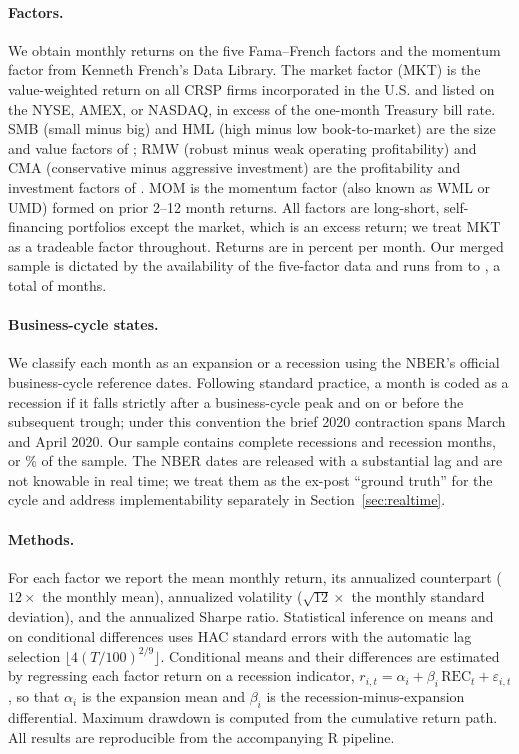 \documentclass[12pt]{article}
\begin{document}
\paragraph{Factors.} We obtain monthly returns on the five Fama--French
factors and the momentum factor from Kenneth French's Data Library. The market
factor (MKT) is the value-weighted return on all CRSP firms incorporated in the
U.S. and listed on the NYSE, AMEX, or NASDAQ, in excess of the one-month
Treasury bill rate. SMB (small minus big) and HML (high minus low book-to-market)
are the size and value factors of \citet{fama1993common}; RMW (robust minus weak
operating profitability) and CMA (conservative minus aggressive investment) are
the profitability and investment factors of \citet{fama2015five}. MOM is the
momentum factor (also known as WML or UMD) formed on prior 2--12 month returns.
All factors are long-short, self-financing portfolios except the market, which
is an excess return; we treat MKT as a tradeable factor throughout. Returns are
in percent per month. Our merged sample is dictated by the availability of the
five-factor data and runs from \sampStart{} to \sampEnd, a total of \nMonths{}
months.

\paragraph{Business-cycle states.} We classify each month as an expansion or a
recession using the NBER's official business-cycle reference dates. Following
standard practice, a month is coded as a recession if it falls strictly after a
business-cycle peak and on or before the subsequent trough; under this
convention the brief 2020 contraction spans March and April 2020. Our sample
contains \nRecessions{} complete recessions and \nRec{} recession months, or
\pctRec\% of the sample. The NBER dates are released with a substantial lag and
are not knowable in real time; we treat them as the ex-post ``ground truth'' for
the cycle and address implementability separately in Section~\ref{sec:realtime}.

\paragraph{Methods.} For each factor we report the mean monthly return, its
annualized counterpart ($12\times$ the monthly mean), annualized volatility
($\sqrt{12}\times$ the monthly standard deviation), and the annualized Sharpe
ratio. Statistical inference on means and on conditional differences uses
\citet{newey1987simple} HAC standard errors with the automatic lag selection
$\lfloor 4(T/100)^{2/9}\rfloor$. Conditional means and their differences are
estimated by regressing each factor return on a recession indicator,
$r_{i,t}=\alpha_i+\beta_i\,\mathrm{REC}_t+\varepsilon_{i,t}$, so that
$\alpha_i$ is the expansion mean and $\beta_i$ is the recession-minus-expansion
differential. Maximum drawdown is computed from the cumulative return path. All
results are reproducible from the accompanying R pipeline.
\end{document}

